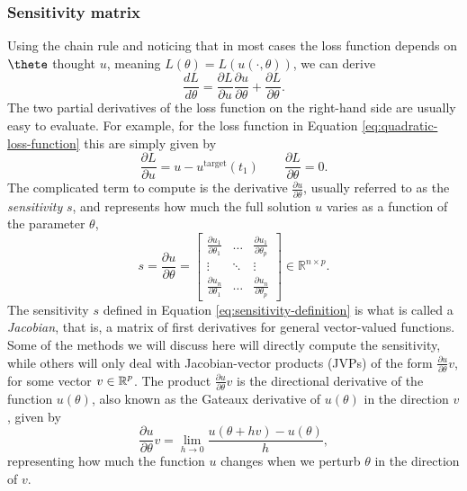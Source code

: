 \subsubsection{Sensitivity matrix}

Using the chain rule and noticing that in most cases the loss function depends on $\thete$ thought $u$, meaning $L(\theta) = L(u(\cdot, \theta))$, we can derive
\begin{equation} 
 \frac{dL}{d\theta} = \frac{\partial L}{\partial u} \frac{\partial u}{\partial \theta} + \frac{\partial L}{\partial \theta}.
 \label{eq:dLdtheta_VJP}
\end{equation} 
The two partial derivatives of the loss function on the right-hand side are usually easy to evaluate.
For example, for the loss function in Equation \eqref{eq:quadratic-loss-function} this are simply given by 
\begin{equation}
    \frac{\partial L}{\partial u} = u - u^{\text{target}}(t_1)
    \qquad 
    \frac{\partial L}{\partial \theta} = 0.
    \label{eq:dLdu}
\end{equation}
The complicated term to compute is the derivative $\frac{\partial u}{\partial \theta}$, usually referred to as the \textit{sensitivity} $s$, and represents how much the full solution $u$ varies as a function of the parameter $\theta$, 
\begin{equation}
 s 
 = 
 \frac{\partial u}{\partial \theta} 
 =
 \begin{bmatrix}
   \frac{\partial u_1}{\partial \theta_1} & \dots & \frac{\partial u_1}{\partial \theta_p} \\
   \vdots & \ddots & \vdots \\
   \frac{\partial u_n}{\partial \theta_1} & \dots & \frac{\partial u_n}{\partial \theta_p}
 \end{bmatrix}
 \in \mathbb R^{n \times p}.
 \label{eq:sensitivity-definition}
\end{equation}
The sensitivity $s$ defined in Equation \eqref{eq:sensitivity-definition} is what is called a \textit{Jacobian}, that is, a matrix of first derivatives for general vector-valued functions.
Some of the methods we will discuss here will directly compute the sensitivity, while others will only deal with Jacobian-vector products (JVPs) of the form $\frac{\partial u}{\partial \theta} v$, for some vector $v \in \operatorname{\mathbb{R}}^p$. 
The product $\frac{\partial u}{\partial \theta}v$ is the directional derivative of the function $u(\theta)$, also known as the Gateaux derivative of $u(\theta)$ in the direction $v$, given by 
\begin{equation}
    \frac{\partial u}{\partial \theta} v 
    = 
    \lim_{h \rightarrow 0} \frac{u(\theta + h v) - u(\theta)}{h},
\end{equation}
representing how much the function $u$ changes when we perturb $\theta$ in the direction of $v$. 

